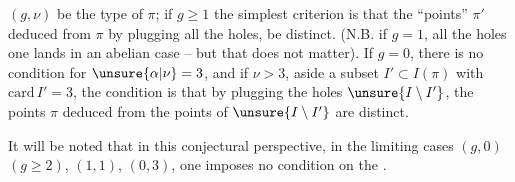  $(g,\nu)$ be the type of $\pi$;  if $g\geq1$ the simplest criterion is that the ``\inserted{$\Gamma^{\natural}$-}points''  $\pi'$ deduced from $\pi$ by plugging all the holes, be distinct.  (N.B. if $g=1$,    all the holes one lands in an abelian case -- but that does not matter). If $g=0$,  there is no condition for $\unsure{\alpha|\nu}=3$, and if $\nu>3$,  aside a  subset $I'\subset I(\pi)$ with $\mathrm{card}\,I'=3$, the condition is that by plugging the holes  $\unsure{I\setminus I'}$, the \inserted{$\Gamma^{\natural}$-}points  $\pi$ deduced from the points of $\unsure{I\setminus I'}$ are distinct.

It will be noted that in this conjectural perspective, in the limiting cases $(g,0)$ $(g\geq2)$, $(1,1)$, $(0,3)$, one imposes no condition  on the .

